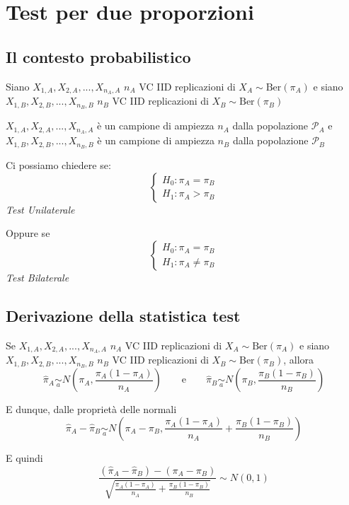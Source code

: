 \documentclass[
  11pt,
]{book}
\theoremstyle{mytheoremstyle}
\theoremstyle{mydefstyle}
\begin{document}
\section{Test per due proporzioni}\label{test-per-due-proporzioni}

\subsection{Il contesto probabilistico}\label{il-contesto-probabilistico-2}

Siano \(X_{1,A},X_{2,A},...,X_{n_A,A}\) \(n_A\) VC IID replicazioni di \(X_A\sim \text{Ber}(\pi_A)\) e siano \(X_{1,B},X_{2,B},...,X_{n_B,B}\) \(n_B\) VC IID replicazioni di \(X_B\sim \text{Ber}(\pi_B)\)

\(X_{1,A},X_{2,A},...,X_{n_A,A}\) è un campione di ampiezza \(n_A\) dalla popolazione \(\mathscr{P}_A\) e \(X_{1,B},X_{2,B},...,X_{n_B,B}\) è un campione di ampiezza \(n_B\) dalla popolazione \(\mathscr{P}_B\)

Ci possiamo chiedere se:
\[\begin{cases}
H_0:\pi_A=\pi_B\\
H_1:\pi_A>\pi_B
\end{cases}\]
\emph{Test Unilaterale}

Oppure se
\[\begin{cases}
H_0:\pi_A=\pi_B\\
H_1:\pi_A\neq\pi_B
\end{cases}\]
\emph{Test Bilaterale}

\subsection{Derivazione della statistica test}\label{derivazione-della-statistica-test-1}

Se \(X_{1,A},X_{2,A},...,X_{n_A,A}\) \(n_A\) VC IID replicazioni di \(X_A\sim \text{Ber}(\pi_A)\) e siano \(X_{1,B},X_{2,B},...,X_{n_B,B}\) \(n_B\) VC IID replicazioni di \(X_B\sim \text{Ber}(\pi_B)\),
allora
\[\hat\pi_A\operatorname*{\sim}_a N\left(\pi_A,\frac {\pi_A(1-\pi_A)}{n_A}\right)\qquad\text{e}\qquad\hat\pi_B\operatorname*{\sim}_a N\left(\pi_B,\frac {\pi_B(1-\pi_B)}{n_B}\right)\]

E dunque, dalle proprietà delle normali
\[\hat\pi_A - \hat\pi_B\operatorname*{\sim}_a N\left(\pi_A-\pi_B,\frac{\pi_A(1-\pi_A)}{n_A}+\frac{\pi_B(1-\pi_B)}{n_B}\right)\]

E quindi
\[\frac{(\hat\pi_A - \hat\pi_B)-(\pi_A-\pi_B)}{\sqrt{\frac{\pi_A(1-\pi_A)}{n_A}+\frac{\pi_B(1-\pi_B)}{n_B}}}\sim N(0,1)\]
\end{document}
